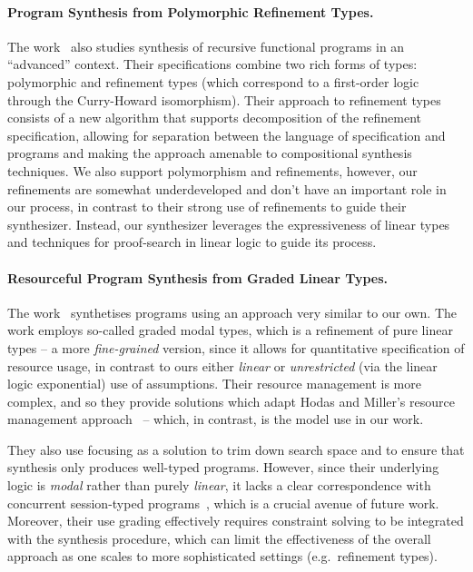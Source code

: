 \documentclass{llncs}
\newcommand{\mypara}[1]{\paragraph{\textbf{#1}.}}
\begin{document}
  
\mypara{Program Synthesis from Polymorphic Refinement Types} The
work~\cite{DBLP:conf/pldi/PolikarpovaKS16} also studies synthesis of recursive
functional programs in an ``advanced'' context. Their specifications combine two
rich forms of types: polymorphic and refinement types (which correspond to a
first-order logic through the Curry-Howard isomorphism). Their approach to
refinement types consists of a new algorithm that supports decomposition of the
refinement specification, allowing for separation between the language of
specification and programs and making the approach amenable to compositional
synthesis techniques. We also support polymorphism and refinements, however, our
refinements are somewhat underdeveloped and don't have an important role in our
process, in contrast to their strong use of refinements to guide their
synthesizer. Instead, our synthesizer leverages the expressiveness of linear
types and techniques for proof-search in linear logic to guide its process.

\mypara{Resourceful Program Synthesis from Graded Linear Types} The
work~\cite{DBLP:conf/lopstr/HughesO20} synthetises programs using an
approach very similar to our own.  The work employs so-called graded
modal types, which is a refinement of pure linear types -- a more
\emph{fine-grained} version, since it allows for quantitative
specification of resource usage, in contrast to ours either
\emph{linear} or \emph{unrestricted} (via the linear logic
exponential) use of assumptions.  Their resource management is more
complex, and so they provide solutions which adapt Hodas and Miller's
resource management
approach~\cite{DBLP:journals/tcs/CervesatoHP00,DBLP:journals/tcs/LiangM09}
-- which, in contrast, is the model use in our work.

They also use focusing as a solution to trim down search space and to
ensure that synthesis only produces well-typed programs. However, since their
underlying logic is \emph{modal} rather than purely \emph{linear}, it
lacks a clear correspondence with concurrent session-typed
programs~\cite{DBLP:journals/mscs/CairesPT16,DBLP:conf/concur/CairesP10},
which is a crucial avenue of future work. Moreover, their use grading
effectively requires constraint solving to be integrated with the
synthesis procedure, which can limit the effectiveness of the overall
approach as one scales to more sophisticated settings (e.g.~refinement
types).
\end{document}

